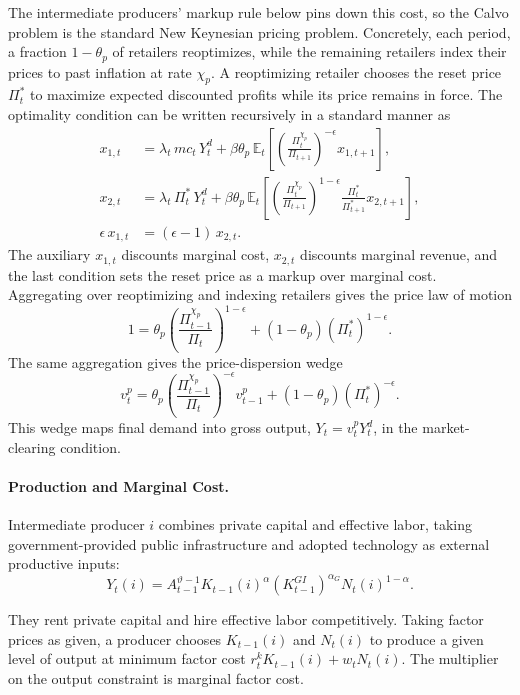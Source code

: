 \documentclass[a4paper,11pt]{article}
\begin{document}
The intermediate producers' markup rule below pins down this cost, so the Calvo problem is the standard New Keynesian pricing problem.
Concretely, each period, a fraction $1-\theta_p$ of retailers reoptimizes, while the remaining retailers index their prices to past inflation at rate $\chi_p$.
A reoptimizing retailer chooses the reset price $\Pi_t^{*}$ to maximize expected discounted profits while its price remains in force.
The optimality condition can be written recursively in a standard manner as
\begin{align*}
    x_{1,t} &= \lambda_t\, mc_t\, Y_t^{d} + \beta\theta_p\, \mathbb{E}_t\!\left[\left(\frac{\Pi_t^{\chi_p}}{\Pi_{t+1}}\right)^{-\epsilon} x_{1,t+1}\right], \\
    x_{2,t} &= \lambda_t\, \Pi_t^{*}\, Y_t^{d} + \beta\theta_p\, \mathbb{E}_t\!\left[\left(\frac{\Pi_t^{\chi_p}}{\Pi_{t+1}}\right)^{1-\epsilon} \frac{\Pi_t^{*}}{\Pi_{t+1}^{*}} x_{2,t+1}\right], \\
    \epsilon\, x_{1,t} &= (\epsilon-1)\, x_{2,t}.
\end{align*}
The auxiliary $x_{1,t}$ discounts marginal cost, $x_{2,t}$ discounts marginal revenue, and the last condition sets the reset price as a markup over marginal cost.
Aggregating over reoptimizing and indexing retailers gives the price law of motion
\[
    1 = \theta_p\left(\frac{\Pi_{t-1}^{\chi_p}}{\Pi_t}\right)^{1-\epsilon} + (1-\theta_p)\left(\Pi_t^{*}\right)^{1-\epsilon}.
\]
The same aggregation gives the price-dispersion wedge
\[
    v_t^{p}
    = \theta_p\left(\frac{\Pi_{t-1}^{\chi_p}}{\Pi_t}\right)^{-\epsilon} v_{t-1}^{p}
    + \left(1-\theta_p\right)\left(\Pi_t^{*}\right)^{-\epsilon}.
\]
This wedge maps final demand into gross output, $Y_t = v_t^{p}Y_t^{d}$, in the market-clearing condition.

\paragraph{Production and Marginal Cost.}
Intermediate producer $i$ combines private capital and effective labor, taking government-provided public infrastructure and adopted technology as external productive inputs:
\[
    Y_t(i) = A_{t-1}^{\vartheta-1}K_{t-1}(i)^{\alpha}\left(K_{t-1}^{GI}\right)^{\alpha_G}N_t(i)^{1-\alpha}.
\]

They rent private capital and hire effective labor competitively.
Taking factor prices as given, a producer chooses $K_{t-1}(i)$ and $N_t(i)$ to produce a given level of output at minimum factor cost $r_t^{k} K_{t-1}(i) + w_t N_t(i)$.
The multiplier on the output constraint is marginal factor cost.
\end{document}
